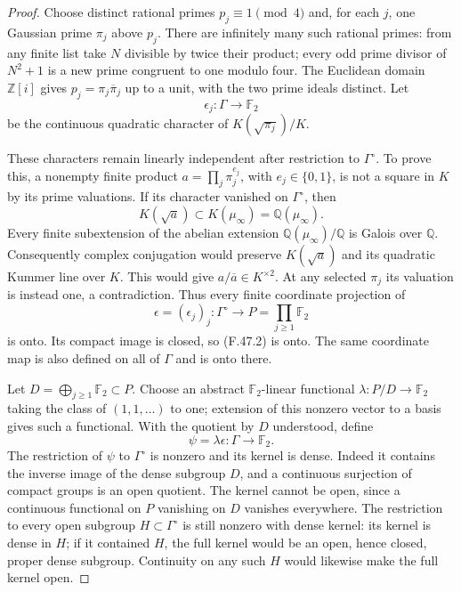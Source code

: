 \begin{proof}
Choose distinct rational primes $p_j\equiv1\pmod4$ and,
for each $j$, one Gaussian prime $\pi_j$ above $p_j$.
There are infinitely many such rational primes: from any
finite list take $N$ divisible by twice their product;
every odd prime divisor of $N^2+1$ is a new prime
congruent to one modulo four. The Euclidean domain
$\mathbb Z[i]$ gives
$p_j=\pi_j\overline\pi_j$ up to a unit, with the two
prime ideals distinct. Let
\[
 \epsilon_j:\Gamma\longrightarrow\mathbb F_2
\]
be the continuous quadratic character of
$K(\sqrt{\pi_j})/K$.

These characters remain linearly independent after
restriction to $\Gamma^\circ$. To prove this, a nonempty
finite product $a=\prod_j\pi_j^{e_j}$, with
$e_j\in\{0,1\}$, is not a square in $K$ by its prime
valuations. If its character vanished on
$\Gamma^\circ$, then
\[
 K(\sqrt a)\subset K(\mu_\infty)=\mathbb Q(\mu_\infty).
 \tag{F.47.1}
\]
Every finite subextension of the abelian extension
$\mathbb Q(\mu_\infty)/\mathbb Q$ is Galois over
$\mathbb Q$. Consequently complex conjugation would
preserve $K(\sqrt a)$ and its quadratic Kummer line
over $K$. This would give
$a/\overline a\in K^{\times2}$. At any selected
$\pi_j$ its valuation is instead one, a contradiction.
Thus every finite coordinate projection of
\[
 \epsilon=(\epsilon_j)_j:\Gamma^\circ
       \longrightarrow P=\prod_{j\ge1}\mathbb F_2
 \tag{F.47.2}
\]
is onto. Its compact image is closed, so (F.47.2) is
onto. The same coordinate map is also defined on all
of $\Gamma$ and is onto there.

Let $D=\bigoplus_{j\ge1}\mathbb F_2\subset P$.
Choose an abstract $\mathbb F_2$-linear functional
$\lambda:P/D\to\mathbb F_2$ taking the class of
$(1,1,\ldots)$ to one; extension of this nonzero vector
to a basis gives such a functional. With the quotient
by $D$ understood, define
\[
 \psi=\lambda\epsilon:\Gamma\longrightarrow\mathbb F_2.
 \tag{F.47.3}
\]
The restriction of $\psi$ to $\Gamma^\circ$ is nonzero
and its kernel is dense. Indeed it contains the inverse
image of the dense subgroup $D$, and a continuous
surjection of compact groups is an open quotient. The
kernel cannot be open, since a continuous functional on
$P$ vanishing on $D$ vanishes everywhere. The restriction
to every open subgroup $H\subset\Gamma^\circ$ is still
nonzero with dense kernel: its kernel is dense in $H$;
if it contained $H$, the full kernel would be an open,
hence closed, proper dense subgroup. Continuity on any
such $H$ would likewise make the full kernel open.


\end{proof}
